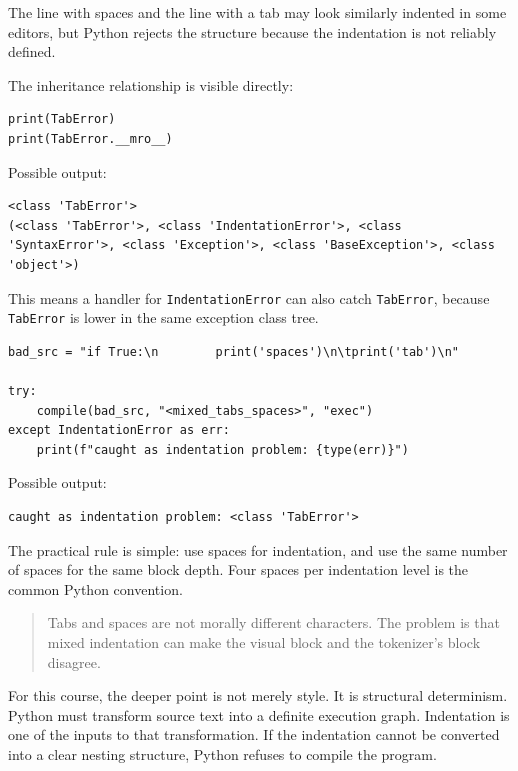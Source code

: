 The line with spaces and the line with a tab may look similarly indented in some editors, but Python rejects the structure because the indentation is not reliably defined.

The inheritance relationship is visible directly:

\begin{verbatim}
print(TabError)
print(TabError.__mro__)
\end{verbatim}

Possible output:

\begin{verbatim}
<class 'TabError'>
(<class 'TabError'>, <class 'IndentationError'>, <class 'SyntaxError'>, <class 'Exception'>, <class 'BaseException'>, <class 'object'>)
\end{verbatim}

This means a handler for \texttt{IndentationError} can also catch \texttt{TabError}, because \texttt{TabError} is lower in the same exception class tree.

\begin{verbatim}
bad_src = "if True:\n        print('spaces')\n\tprint('tab')\n"

try:
    compile(bad_src, "<mixed_tabs_spaces>", "exec")
except IndentationError as err:
    print(f"caught as indentation problem: {type(err)}")
\end{verbatim}

Possible output:

\begin{verbatim}
caught as indentation problem: <class 'TabError'>
\end{verbatim}

The practical rule is simple: use spaces for indentation, and use the same number of spaces for the same block depth. Four spaces per indentation level is the common Python convention.

\begin{quote}
Tabs and spaces are not morally different characters. The problem is that mixed indentation can make the visual block and the tokenizer's block disagree.
\end{quote}

For this course, the deeper point is not merely style. It is structural determinism. Python must transform source text into a definite execution graph. Indentation is one of the inputs to that transformation. If the indentation cannot be converted into a clear nesting structure, Python refuses to compile the program.
